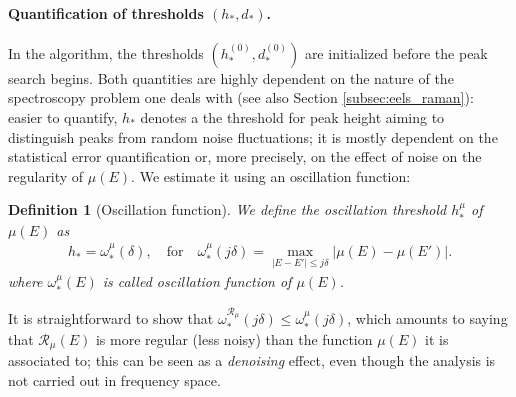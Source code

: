\documentclass[%
 reprint,
 amsmath,amssymb,
 aps,
]{revtex4-1}
\newtheorem{Definition}[Lemma]{Definition}
\begin{document}
\paragraph*{Quantification of thresholds $(h_*,d_*)$.}\label{subsec:quantification} In the algorithm, the thresholds $(h_*^{(0)}, d_*^{(0)})$ are initialized before the peak search begins. Both quantities are highly dependent on the nature of the spectroscopy problem one deals with (see also Section \ref{subsec:eels_raman}): %
easier to quantify, $h_*$ denotes a the threshold for peak height aiming to distinguish peaks from random noise fluctuations; it is mostly dependent on the statistical error quantification or, more precisely, on the effect of noise on the regularity of $\mu(E)$. We estimate it using an oscillation function:

\begin{Definition}[Oscillation function]\label{def:osc}
 We define the oscillation threshold $h_*^{\mu}$ of   $\mu(E)$ as 
 \begin{align*}
h_*= \omega_*^{\mu}(\delta), \quad \text{for} \quad \omega_*^{\mu}(j \delta) = \max_{\vert E - E'\vert\leq j \delta } \vert \mu(E) - \mu(E')\vert.
 \end{align*}
 where $\omega_*^{\mu}(E)$ is called  \textit{oscillation function} of $\mu(E)$.
\end{Definition}
%
It is straightforward to show that $\omega_*^{\mathcal{R}_{\mu}}(j\delta)\leq \omega_*^{\mu}(j\delta)$, which amounts to saying that $\mathcal{R}_{\mu}(E)$ is more regular (less noisy) than the function $\mu(E)$ it is associated to; this can be seen as a \textit{denoising} effect, even though the analysis is not carried out in frequency space. 
\end{document}
